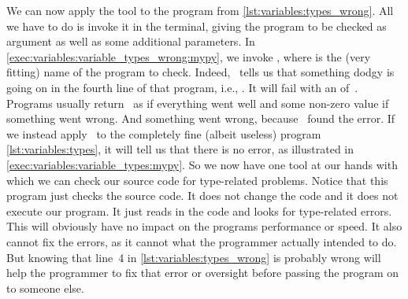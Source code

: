 We can now apply the tool to the program from \cref{lst:variables:types_wrong}.
All we have to do is invoke it in the terminal, giving the program to be checked as argument as well as some additional parameters.
In \cref{exec:variables:variable_types_wrong:mypy}, we invoke , where  is the (very fitting) name of the program to check.
Indeed, \mypy\ tells us that something dodgy is going on in the fourth line of that program, i.e., .
It will fail with an  of~.
Programs usually return~ as  if everything went well and some non-zero value if something went wrong.
And something went wrong, because \mypy\ found the error.%
%
%
%
If we instead apply \mypy\ to the completely fine (albeit useless) program \cref{lst:variables:types}, it will tell us that there is no error, as illustrated in \cref{exec:variables:variable_types:mypy}.
So we now have one tool at our hands with which we can check our source code for type-related problems.
Notice that this program just checks the source code.
It does not change the code and it does not execute our program.
It just reads in the code and looks for type-related errors.
This will obviously have no impact on the programs performance or speed.
It also cannot fix the errors, as it cannot what the programmer actually intended to do.
But knowing that line~4 in \cref{lst:variables:types_wrong} is probably wrong will help the programmer to fix that error or oversight before passing the program on to someone else.%
%
%
